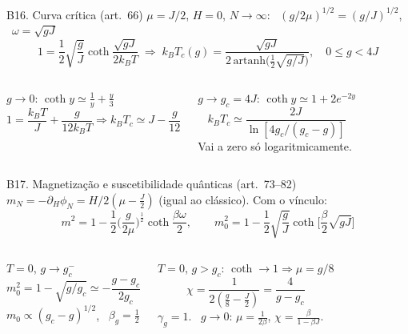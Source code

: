 \documentclass[10pt,aspectratio=169]{beamer}
\newcommand{\eq}[1]{\textcolor{qcdBlue!70!black}{\small(#1)}}
\begin{document}
\begin{frame}{B16. Curva crítica \eq{art.~66}}
  \small
  $\mu=J/2$, $H=0$, $N\to\infty$: \ $(g/2\mu)^{1/2}=(g/J)^{1/2}$, \ $\omega=\sqrt{gJ}$
  \[1=\frac12\sqrt{\frac gJ}\coth\frac{\sqrt{gJ}}{2k_BT}\;\Longrightarrow\;
    k_BT_c(g)=\frac{\sqrt{gJ}}{2\,\mathrm{artanh}\big(\frac12\sqrt{g/J}\big)},\quad0\le g<4J\]
  \begin{columns}[T]
    \begin{block}{$g\to0$: $\coth y\simeq\frac1y+\frac y3$}
      \[1=\frac{k_BT}J+\frac g{12k_BT}\Rightarrow k_BT_c\simeq J-\frac g{12}\]
    \end{block}
    \begin{block}{$g\to g_c=4J$: $\coth y\simeq1+2e^{-2y}$}
      \[k_BT_c\simeq\frac{2J}{\ln[4g_c/(g_c-g)]}\]
      Vai a zero só logaritmicamente.
    \end{block}
  \end{columns}
\end{frame}

\begin{frame}{B17. Magnetização e suscetibilidade quânticas \eq{art.~73--82}}
  \small
  $m_N=-\partial_H\phi_N=H/2(\mu-\frac J2)$ (igual ao clássico). Com o vínculo:
  \[m^2=1-\frac12\Big(\frac g{2\mu}\Big)^{\frac12}\coth\frac{\beta\omega}2,\qquad
    m_0^2=1-\frac12\sqrt{\frac gJ}\coth\Big[\frac\beta2\sqrt{gJ}\Big]\]
  \begin{columns}[T]
    \begin{block}{$T=0$, $g\to g_c^-$}
      \[m_0^2=1-\sqrt{g/g_c}\simeq-\frac{g-g_c}{2g_c}\]
      $m_0\propto(g_c-g)^{1/2}$, \ $\beta_g=\frac12$
    \end{block}
    \begin{block}{$T=0$, $g>g_c$: $\coth\to1\Rightarrow\mu=g/8$}
      \[\chi=\frac1{2(\frac g8-\frac J2)}=\frac4{g-g_c}\]
      $\gamma_g=1$. \ $g\to0$: $\mu=\frac1{2\beta}$, $\chi=\frac\beta{1-\beta J}$.
    \end{block}
  \end{columns}
\end{frame}
\end{document}
